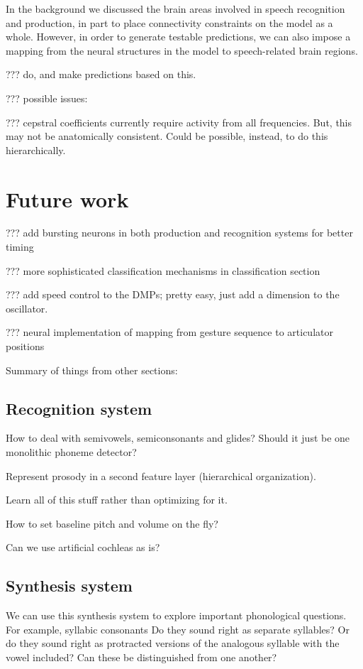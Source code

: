 In the background we discussed the brain areas
involved in speech recognition and production,
in part to place connectivity constraints
on the model as a whole.
However, in order to generate testable predictions,
we can also impose a mapping from
the neural structures in the model
to speech-related brain regions.

??? do, and make predictions based on this.

??? possible issues:

??? cepstral coefficients currently require activity
from all frequencies. But, this may not be anatomically
consistent. Could be possible, instead, to do this
hierarchically.

\section{Future work}

??? add bursting neurons in both production
and recognition systems for better timing

??? more sophisticated classification mechanisms
in classification section

??? add speed control to the DMPs;
pretty easy, just add a dimension to the oscillator.

??? neural implementation of mapping
from gesture sequence to articulator positions

Summary of things from other sections:

\subsection{Recognition system}

How to deal with semivowels, semiconsonants and glides?
Should it just be one monolithic phoneme detector?

Represent prosody in a second feature layer (hierarchical organization).

Learn all of this stuff rather than optimizing for it.

How to set baseline pitch and volume on the fly?

Can we use artificial cochleas as is?

\subsection{Synthesis system}

We can use this synthesis system to explore
important phonological questions.
For example, syllabic consonants
Do they sound right as separate syllables?
Or do they sound right as protracted versions
of the analogous syllable with the vowel included?
Can these be distinguished from one another?

